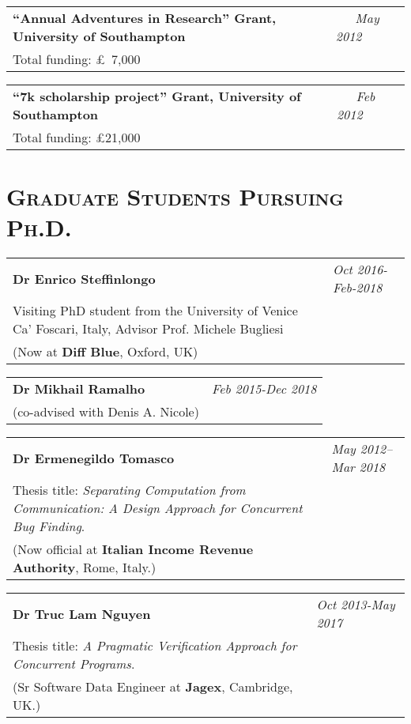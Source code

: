 \begin{resume}
\begin{tabular}{@{}p{4.6in}p{1.8in}}
{\bf ``Annual Adventures in Research'' Grant, University of Southampton} & \emph{~~~May 2012}  \\
Total funding: \pounds ~7,000 \\
\end{tabular}



\begin{tabular}{@{}p{4.6in}p{1.8in}}
{\bf ``7k scholarship project'' Grant, University of Southampton} & \emph{~~~Feb 2012}  \\
Total funding: \pounds  21,000 \\
\end{tabular}




\section{\bfseries \scshape  Graduate Students Pursuing Ph.D.}


\begin{tabular}{@{}p{4.6in}p{1.8in}}
{\bf Dr Enrico Steffinlongo } & \emph{Oct 2016-Feb-2018}  \\
Visiting PhD student from the University of Venice Ca' Foscari, Italy, Advisor Prof. Michele Bugliesi\\
(Now at {\bf Diff Blue}, Oxford, UK)  
\end{tabular}


\begin{tabular}{@{}p{4.6in}p{1.8in}}
{\bf Dr Mikhail Ramalho } & \emph{Feb 2015-Dec 2018}  \\
(co-advised with Denis A. Nicole) 
\end{tabular}

\begin{tabular}{@{}p{4.6in}p{1.8in}}
{\bf Dr Ermenegildo Tomasco } & \emph{May 2012--Mar 2018}  \\
Thesis title: {\em Separating Computation from Communication:
A Design Approach for
Concurrent Bug Finding}.\\
(Now official at {\bf Italian Income Revenue Authority}, Rome, Italy.) 
\end{tabular}

\begin{tabular}{@{}p{4.6in}p{1.8in}}
{\bf Dr Truc Lam Nguyen } & \emph{Oct 2013-May 2017}  \\
Thesis title: {\em A Pragmatic Verification Approach for Concurrent Programs}.\\
(Sr Software Data Engineer at {\bf Jagex}, Cambridge, UK.) 
\end{tabular}


\end{resume}
